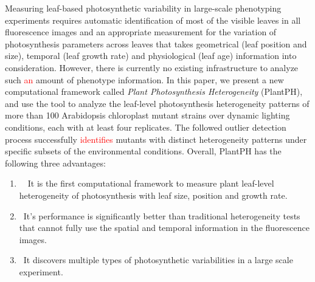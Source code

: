 \documentclass{bioinfo}
\begin{document}
Measuring leaf-based photosynthetic variability in large-scale phenotyping experiments requires automatic%
identification of most of the visible leaves in all fluorescence images and an appropriate measurement for the variation of photosynthesis parameters across leaves that takes geometrical (leaf position and size), temporal (leaf growth rate) and physiological (leaf age) information into consideration. However, there is currently no existing infrastructure to analyze such \textcolor{red}{an} amount of phenotype information. %
%
In this paper, we present a new computational framework called {\it Plant Photosynthesis Heterogeneity} (PlantPH), and use the tool to analyze the leaf-level photosynthesis heterogeneity patterns of more than 100 Arabidopsis chloroplast mutant strains over dynamic lighting conditions, each with at least four replicates. The followed outlier detection process successfully \textcolor{red}{identifies} %
mutants with distinct heterogeneity patterns under specific subsets of the environmental conditions.
%
Overall, PlantPH has the following three advantages: %
\begin{enumerate}\vspace{-0.1in}
  \item~~It is the first computational framework to measure plant leaf-level heterogeneity of photosynthesis with leaf size, position and growth rate.
  \item~It's performance is significantly better than %
traditional heterogeneity tests that cannot fully use the spatial and temporal information in the fluorescence images.
  \item~It discovers multiple types of photosynthetic variabilities in a large scale experiment.
\end{enumerate}

%
%
%


\vspace{-0.2in}
\end{document}

